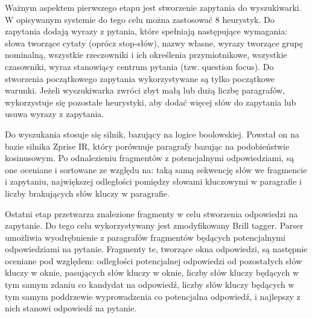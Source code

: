 Ważnym aspektem pierwszego etapu jest stworzenie zapytania do wyszukiwarki. W opisywanym systemie do tego celu można zastosować 8 heurystyk. Do zapytania dodają wyrazy z pytania, które spełniają następujące wymagania: słowa tworzące cytaty (oprócz stop-słów), nazwy własne, wyrazy tworzące grupę nominalną, wszystkie rzeczowniki i ich określenia przymiotnikowe, wszystkie czasowniki, wyraz stanowiący centrum pytania (tzw. question focus). Do stworzenia początkowego zapytania wykorzystywane są tylko początkowe warunki. Jeżeli wyszukiwarka zwróci zbyt małą lub dużą liczbę paragrafów, wykorzystuje się pozostałe heurystyki, aby dodać więcej słów do zapytania lub usuwa wyrazy z zapytania. 

Do wyszukania stosuje się silnik, bazujący na logice boolowskiej.  Powstał on na bazie silnika Zprise IR, który porównuje paragrafy bazując na podobieństwie kosinusowym. Po odnalezieniu fragmentów z potencjalnymi odpowiedziami, są one oceniane i sortowane ze względu na: taką samą sekwencję słów we fragmencie i zapytaniu, największej odległości pomiędzy słowami kluczowymi w paragrafie i liczby brakujących słów kluczy w paragrafie. 

Ostatni etap przetwarza znalezione fragmenty w celu stworzenia odpowiedzi na zapytanie. Do tego celu wykorzystywany jest zmodyfikowany Brill tagger. Parser umożliwia wyodrębnienie z paragrafów fragmentów będących potencjalnymi odpowiedziami na pytanie. Fragmenty te, tworzące okna odpowiedzi, są następnie oceniane pod względem:  odległości potencjalnej odpowiedzi od pozostałych słów kluczy w oknie, pasujących słów kluczy w oknie, liczby słów kluczy będących w tym samym zdaniu co kandydat na odpowiedź, liczby słów kluczy będących w tym samym poddrzewie wyprowadzenia co potencjalna odpowiedź, i najlepszy z nich stanowi odpowiedź na pytanie.
